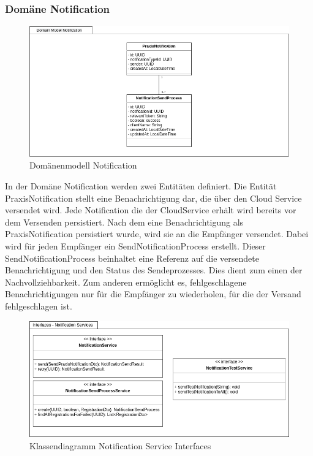 \clearpage
\subsubsection{Domäne Notification}

\begin{figure}[h]
    \centering
    \begin{minipage}[b]{1.0\textwidth}
        \includegraphics[width=\textwidth]{graphics/Class_Notification_Domain}
        \caption{Domänenmodell Notification}
    \end{minipage}
\end{figure}

In der Domäne Notification werden zwei Entitäten definiert.
Die Entität PraxisNotification stellt eine Benachrichtigung dar, die über den Cloud Service versendet wird.
Jede Notification die der CloudService erhält wird bereits vor dem Versenden persistiert.
Nach dem eine Benachrichtigung als PraxisNotification persistiert wurde, wird sie an die Empfänger versendet.
Dabei wird für jeden Empfänger ein SendNotificationProcess erstellt.
Dieser SendNotificationProcess beinhaltet eine Referenz auf die versendete Benachrichtigung und den Status des Sendeprozesses.
Dies dient zum einen der Nachvollziehbarkeit.
Zum anderen ermöglicht es, fehlgeschlagene Benachrichtigungen nur für die Empfänger zu wiederholen, für die der Versand fehlgeschlagen ist.

\begin{figure}[h]
    \centering
    \begin{minipage}[b]{0.9\textwidth}
        \includegraphics[width=\textwidth]{graphics/Class_Notification_Services}
        \caption{Klassendiagramm Notification Service Interfaces}
    \end{minipage}
\end{figure}

